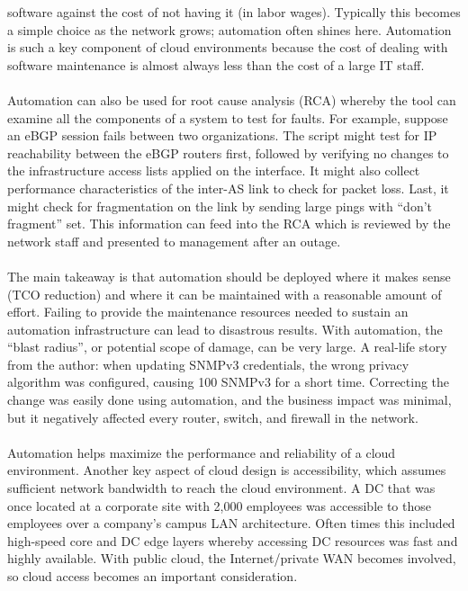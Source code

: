 software against the cost of not having it (in labor wages). Typically this
becomes a simple choice as the network grows; automation often shines here.
Automation is such a key component of cloud environments because the cost of
dealing with software maintenance is almost always less than the cost of a
large IT staff.
\\ \\
Automation can also be used for root cause analysis (RCA) whereby the tool can
examine all the components of a system to test for faults. For example,
suppose an eBGP session fails between two organizations. The script might test
for IP reachability between the eBGP routers first, followed by verifying no
changes to the infrastructure access lists applied on the interface. It might
also collect performance characteristics of the inter-AS link to check for
packet loss. Last, it might check for fragmentation on the link by sending
large pings with ``don’t fragment'' set. This information can feed into the RCA
which is reviewed by the network staff and presented to management after an
outage.
\\ \\
The main takeaway is that automation should be deployed where it makes sense
(TCO reduction) and where it can be maintained with a reasonable amount of
effort. Failing to provide the maintenance resources needed to sustain an
automation infrastructure can lead to disastrous results. With automation, the
``blast radius'', or potential scope of damage, can be very large. A real-life
story from the author: when updating SNMPv3 credentials, the wrong privacy
algorithm was configured, causing 100%
SNMPv3 for a short time. Correcting the change was easily done using
automation, and the business impact was minimal, but it negatively affected
every router, switch, and firewall in the
network.
\\ \\
Automation helps maximize the performance and reliability of a cloud
environment. Another key aspect of cloud design is accessibility, which
assumes sufficient network bandwidth to reach the cloud environment. A DC that
was once located at a corporate site with 2,000 employees was accessible to
those employees over a company’s campus LAN architecture. Often times this
included high-speed core and DC edge layers whereby accessing DC resources was
fast and highly available. With public cloud, the Internet/private WAN becomes
involved, so cloud access becomes an important consideration.
\\ \\

